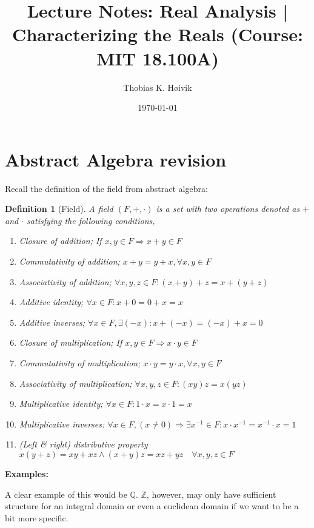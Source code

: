 \documentclass[12pt]{article}
\title{Lecture Notes: Real Analysis | Characterizing the Reals (Course: MIT 18.100A)}
\author{Thobias K. Høivik}
\date{\today}
\newtheorem{definition}{Definition}
\begin{document}
\maketitle

\section*{Abstract Algebra revision}

Recall the definition of the field from abstract algebra:
\begin{definition}[Field]
    A field \((F, +, \cdot)\) is a set with two operations denoted as \(+\) and \(\cdot\) 
    satisfying the following conditions, 
    \begin{enumerate}
        \item Closure of addition; If \(x,y\in F \Rightarrow x+y \in F\) 
        \item Commutativity of addition; \(x+y=y+x, \forall x,y \in F\)
        \item Associativity of addition; \(\forall x,y,z \in F : 
            (x+y)+z=x+(y+z)\)
        \item Additive identity; \(\forall x \in F: x+0=0+x=x\)
        \item Additive inverses; \(\forall x \in F, \exists (-x):x+(-x)=(-x)+x = 0\)
        \item Closure of multiplication; If \(x,y \in F \Rightarrow x\cdot y \in F\)
        \item Commutativity of multiplication; \(x \cdot y=y\cdot x, \forall x,y \in F\)
        \item Associativity of multiplication; \(\forall x,y,z \in F : (xy)z=x(yz)\) 
        \item Multiplicative identity; \(\forall x \in F: 1 \cdot x = x \cdot 1 = x\) 
        \item Multiplicative inverses: \(\forall x \in F, (x \neq 0) \Rightarrow
            \exists x^{-1} \in F : x \cdot x^{-1} = x^{-1} \cdot x = 1\)
        \item (Left \& right) distributive property \(x(y+z) = xy + xz \land 
            (x +y)z = xz+yz \quad \forall x,y,z \in F\)
    \end{enumerate}
\end{definition}

\noindent 
\textbf{Examples:}

\noindent
A clear example of this would be \(\mathbb Q\). \(\mathbb Z\), however, may only 
have sufficient structure for an integral domain
or even a euclidean domain if we want to be a bit more specific.
\end{document}
